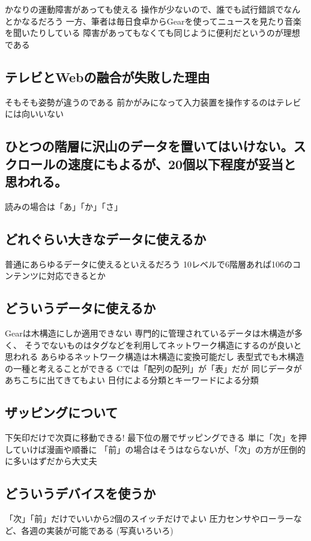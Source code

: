 \documentclass[twoside]{wiss}
\begin{document}
  かなりの運動障害があっても使える
  操作が少ないので、誰でも試行錯誤でなんとかなるだろう
  一方、筆者は毎日食卓からGearを使ってニュースを見たり音楽を聞いたりしている
  障害があってもなくても同じように便利だというのが理想である

\subsection*{テレビとWebの融合が失敗した理由}
   そもそも姿勢が違うのである
   前かがみになって入力装置を操作するのはテレビには向いいない

\subsection*{ひとつの階層に沢山のデータを置いてはいけない。スクロールの速度にもよるが、20個以下程度が妥当と思われる。}
   読みの場合は「あ」「か」「さ」

\subsection*{どれぐらい大きなデータに使えるか}

   普通にあらゆるデータに使えるといえるだろう
   10レベルで6階層あれば10\^6のコンテンツに対応できるとか

\subsection*{どういうデータに使えるか}
   Gearは木構造にしか適用できない
   専門的に管理されているデータは木構造が多く、
   そうでないものはタグなどを利用してネットワーク構造にするのが良いと思われる
   あらゆるネットワーク構造は木構造に変換可能だし
     表型式でも木構造の一種と考えることができる
     Cでは「配列の配列」が「表」だが
   同じデータがあちこちに出てきてもよい
     日付による分類とキーワードによる分類

\subsection*{ザッピングについて}
   下矢印だけで次頁に移動できる!
   最下位の層でザッピングできる
   単に「次」を押していけば漫画や順番に
   「前」の場合はそうはならないが、「次」の方が圧倒的に多いはずだから大丈夫

\subsection*{どういうデバイスを使うか}
  「次」「前」だけでいいから2個のスイッチだけでよい
   圧力センサやローラーなど、各週の実装が可能である
   (写真いろいろ)
\end{document}
